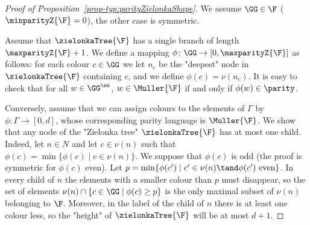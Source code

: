 \documentclass{theoretics}
\begin{document}
	
\begin{proof}[Proof of Proposition~\ref{prop-typ:parityZielonkaShape}]
	We assume $\GG\in \F$ ($\minparityZ{\F}=0$), the other case is symmetric.
			
	Assume that $\zielonkaTree{\F}$ has a single branch of length $\maxparityZ{\F}+1$. We define a mapping $\phi\colon \GG \to [0, \maxparityZ{\F}]$ as  follows: for each colour $c\in \GG$ we let $n_c$ be the "deepest" node in $\zielonkaTree{\F}$ containing $c$, and we define $\phi(c) = \nu(n_c)$. It is easy to check that for all $w\in\GG^\oo$, $w\in \Muller{\F}$ if and only if $\phi(w)\in \parity$.
	
			
	Conversely, assume that we can assign colours to the elements of $\Gamma$ by $\phi:\Gamma \rightarrow [0, d]$, whose corresponding parity language is $\Muller{\F}$. We show that any node of the "Zielonka tree" $\zielonkaTree{\F}$ has at most one child. Indeed, let $n \in N$ and let $c\in \nu(n)$ such that $\phi(c) = \min\{\phi(c) \mid c\in \nu(n)\}$. We suppose that $\phi(c)$ is odd (the proof is symmetric for $\phi(c)$ even). Let $p = \min\{\phi(c') \mid c'\in \nu(n) \tand \phi(c') \text{ even}\}$. In every child of $n$ the elements with a smaller colour than $p$ must disappear, so the set of elements $\nu(n)\cap \{c\in \GG \mid \phi(c) \geq p \}$ is the only maximal subset of $\nu(n)$ belonging to $\F$. Moreover, in the label of the child of $n$ there is at least one colour less, so the "height" of $\zielonkaTree{\F}$ will be at most $d+1$.
\end{proof}

 	
\end{document}
